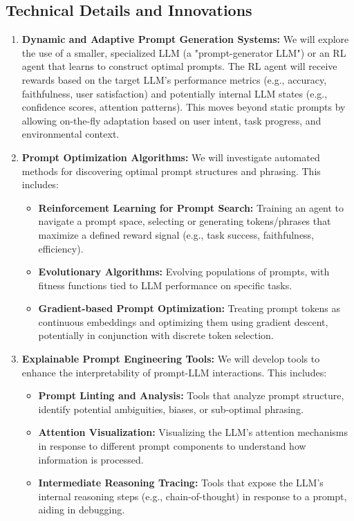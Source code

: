 \documentclass{article}
\begin{document}
\subsection{Technical Details and Innovations}
\begin{enumerate}[label=\arabic*.]
    \item \textbf{Dynamic and Adaptive Prompt Generation Systems:} We will explore the use of a smaller, specialized LLM (a "prompt-generator LLM") or an RL agent that learns to construct optimal prompts. The RL agent will receive rewards based on the target LLM's performance metrics (e.g., accuracy, faithfulness, user satisfaction) and potentially internal LLM states (e.g., confidence scores, attention patterns). This moves beyond static prompts by allowing on-the-fly adaptation based on user intent, task progress, and environmental context.
    \item \textbf{Prompt Optimization Algorithms:} We will investigate automated methods for discovering optimal prompt structures and phrasing. This includes:
    \begin{itemize}
        \item \textbf{Reinforcement Learning for Prompt Search:} Training an agent to navigate a prompt space, selecting or generating tokens/phrases that maximize a defined reward signal (e.g., task success, faithfulness, efficiency).
        \item \textbf{Evolutionary Algorithms:} Evolving populations of prompts, with fitness functions tied to LLM performance on specific tasks.
    \item \textbf{Gradient-based Prompt Optimization:} Treating prompt tokens as continuous embeddings and optimizing them using gradient descent, potentially in conjunction with discrete token selection.
    \end{itemize}
    \item \textbf{Explainable Prompt Engineering Tools:} We will develop tools to enhance the interpretability of prompt-LLM interactions. This includes:
    \begin{itemize}
        \item \textbf{Prompt Linting and Analysis:} Tools that analyze prompt structure, identify potential ambiguities, biases, or sub-optimal phrasing.
        \item \textbf{Attention Visualization:} Visualizing the LLM's attention mechanisms in response to different prompt components to understand how information is processed.
        \item \textbf{Intermediate Reasoning Tracing:} Tools that expose the LLM's internal reasoning steps (e.g., chain-of-thought) in response to a prompt, aiding in debugging.
    \end{itemize}
\end{enumerate}
\end{document}
